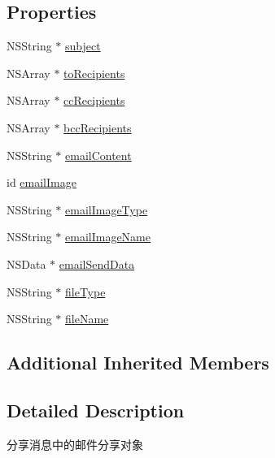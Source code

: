\subsection*{Properties}
\begin{DoxyCompactItemize}
\item 
N\+S\+String $\ast$ \mbox{\hyperlink{interface_u_m_share_email_object_a7835f2a5fec3cad02ae6c92c9d9ab9c9}{subject}}
\item 
N\+S\+Array $\ast$ \mbox{\hyperlink{interface_u_m_share_email_object_a0db1ef75a2d88afd756bfed0c9e10777}{to\+Recipients}}
\item 
N\+S\+Array $\ast$ \mbox{\hyperlink{interface_u_m_share_email_object_acc4f07e43ae02b5ce07976dd294acd68}{cc\+Recipients}}
\item 
N\+S\+Array $\ast$ \mbox{\hyperlink{interface_u_m_share_email_object_aa418fcd40d50dfc197e138ecb5935858}{bcc\+Recipients}}
\item 
N\+S\+String $\ast$ \mbox{\hyperlink{interface_u_m_share_email_object_a292207c22034c329424613c22f530eaf}{email\+Content}}
\item 
id \mbox{\hyperlink{interface_u_m_share_email_object_ace730ed87fa33061c2d7c742bab4ee08}{email\+Image}}
\item 
N\+S\+String $\ast$ \mbox{\hyperlink{interface_u_m_share_email_object_a2f0beb066b3c76074f396d49bece364d}{email\+Image\+Type}}
\item 
N\+S\+String $\ast$ \mbox{\hyperlink{interface_u_m_share_email_object_a2812c0b82edf464a1a2294cffccf7af2}{email\+Image\+Name}}
\item 
N\+S\+Data $\ast$ \mbox{\hyperlink{interface_u_m_share_email_object_af1e2f32f87cb8d498e3845b2776efcd3}{email\+Send\+Data}}
\item 
N\+S\+String $\ast$ \mbox{\hyperlink{interface_u_m_share_email_object_a1f2ac64e44e203c646fa64f977614123}{file\+Type}}
\item 
N\+S\+String $\ast$ \mbox{\hyperlink{interface_u_m_share_email_object_a22f5fd4377c2653ebe9078703f1294c4}{file\+Name}}
\end{DoxyCompactItemize}
\subsection*{Additional Inherited Members}


\subsection{Detailed Description}
分享消息中的邮件分享对象 

